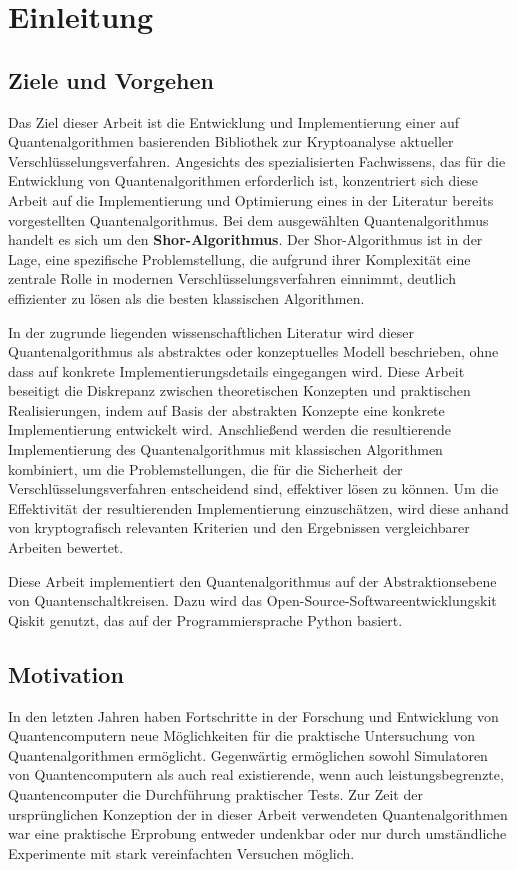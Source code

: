 \section{Einleitung}

\subsection{Ziele und Vorgehen}
Das Ziel dieser Arbeit ist die Entwicklung und Implementierung einer auf Quantenalgorithmen 
basierenden Bibliothek zur Kryptoanalyse aktueller Verschlüsselungsverfahren. 
Angesichts des spezialisierten Fachwissens, das für die Entwicklung von Quantenalgorithmen erforderlich ist, 
konzentriert sich diese Arbeit auf die Implementierung und Optimierung eines in der Literatur bereits vorgestellten Quantenalgorithmus.
Bei dem ausgewählten Quantenalgorithmus handelt es sich um den \textbf{Shor-Algorithmus}.
Der Shor-Algorithmus ist in der Lage, eine spezifische Problemstellung, 
die aufgrund ihrer Komplexität eine zentrale Rolle in modernen Verschlüsselungsverfahren einnimmt, 
deutlich effizienter zu lösen als die besten klassischen Algorithmen.

In der zugrunde liegenden wissenschaftlichen Literatur wird dieser Quantenalgorithmus als abstraktes oder konzeptuelles Modell beschrieben, 
ohne dass auf konkrete Implementierungsdetails eingegangen wird. 
Diese Arbeit beseitigt die Diskrepanz zwischen theoretischen Konzepten und praktischen Realisierungen, 
indem auf Basis der abstrakten Konzepte eine konkrete Implementierung entwickelt wird.
Anschließend werden die resultierende Implementierung des Quantenalgorithmus mit klassischen Algorithmen kombiniert, 
um die Problemstellungen, die für die Sicherheit der Verschlüsselungsverfahren entscheidend sind, effektiver lösen zu können. 
Um die Effektivität der resultierenden Implementierung einzuschätzen, 
wird diese anhand von kryptografisch relevanten Kriterien und den Ergebnissen vergleichbarer Arbeiten bewertet.

Diese Arbeit implementiert den Quantenalgorithmus auf der Abstraktionsebene von Quantenschaltkreisen.
Dazu wird das Open-Source-Softwareentwicklungskit Qiskit genutzt, das auf der Programmiersprache Python basiert.

\subsection{Motivation}
In den letzten Jahren haben Fortschritte in der Forschung und Entwicklung von Quantencomputern neue Möglichkeiten für die praktische Untersuchung von Quantenalgorithmen ermöglicht.
Gegenwärtig ermöglichen sowohl Simulatoren von Quantencomputern als auch real existierende, wenn auch leistungsbegrenzte, Quantencomputer die Durchführung praktischer Tests.
Zur Zeit der ursprünglichen Konzeption der in dieser Arbeit verwendeten Quantenalgorithmen war eine praktische Erprobung entweder undenkbar oder nur durch umständliche Experimente mit stark vereinfachten Versuchen möglich.

